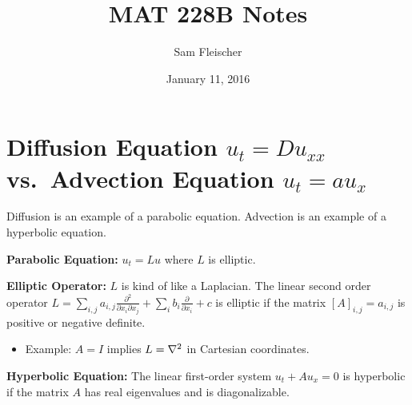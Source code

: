 \documentclass{article}
\title{MAT 228B Notes}
\author{Sam Fleischer}
\date{January 11, 2016}
\begin{document}
    \maketitle

    \section{Diffusion Equation $u_t = Du_{xx}$ vs.~Advection Equation $u_t = au_x$}

        Diffusion is an example of a parabolic equation.  Advection is an example of a hyperbolic equation.

        \textbf{Parabolic Equation:} $u_t = Lu$ where $L$ is elliptic.

        \textbf{Elliptic Operator:} $L$ is kind of like a Laplacian.  The linear second order operator $L = \sum_{i,j}a_{i,j}\frac{\partial^2}{\partial x_i \partial x_j} + \sum_{i}b_i \frac{\partial}{\partial x_i} + c$ is elliptic if the matrix $[A]_{i,j} = a_{i,j}$ is positive or negative definite.

        \begin{itemize}
            \item Example: $A = I$ implies $L = \laplacian$ in Cartesian coordinates.
        \end{itemize}

        \textbf{Hyperbolic Equation:} The linear first-order system $u_t + Au_x = 0$ is hyperbolic if the matrix $A$ has real eigenvalues and is diagonalizable.
\end{document}
